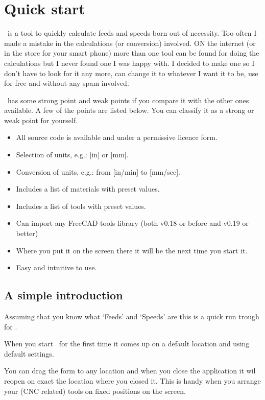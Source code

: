 \chapter{Quick start}\label{QuickStart}

\CC\ is a tool to quickly calculate feeds and speeds born out of necessity. Too often I made a mistake
in the calculations (or conversion) involved. ON the internet (or in the store for your smart phone)
more than one tool can be found for doing the calculations but I never found one I was happy with.
I decided to make one so I don't have to look for it any more, can change it to whatever I want it to be,
use for free and without any spam involved.

\CC\ has some strong point and weak points if you compare it with the other ones available.
A few of the points are listed below. You can classify it as a strong or weak point for yourself.
\begin{itemize}
    \item All source code is available and under a permissive licence form.
    \item Selection of units, e.g.: [in] or [mm].
    \item Conversion of units, e.g.: from [in/min] to [mm/sec].
    \item Includes a list of materials with preset values.
    \item Includes a list of tools with preset values.
    \item Can import any FreeCAD tools library (both v0.18 or before and v0.19 or better)
    \item Where you put it on the screen there it will be the next time you start it.
    \item Easy and intuitive to use.
\end{itemize}

\section{A simple introduction}
Assuming that you know what `Feeds' and `Speeds' are this is a quick run trough for \CC.

When you start \CC\ for the first time it comes up on a default location and using default settings.

You can drag the form to any location and when you close the application it wil reopen on exact
the location where you closed it. This is handy when you arrange your (CNC related) tools on fixed
positions on the screen.

